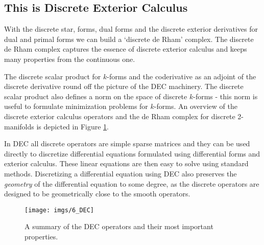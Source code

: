  
\subsection{This is Discrete Exterior Calculus}


With the discrete star, forms, dual forms and the discrete exterior derivatives for dual and primal forms we can build a `discrete de Rham' complex. The discrete de Rham complex captures the essence of discrete exterior calculus and keeps many properties from the continuous one. 

The discrete scalar product for $k$-forms and the coderivative as an adjoint of the discrete derivative round off the picture of the DEC machinery. The discrete scalar product also defines a norm on the space of discrete $k$-forms - this norm is useful to formulate minimization problems for $k$-forms.
An overview of the discrete exterior calculus operators and the de Rham complex for discrete 2-manifolds is depicted in Figure \ref{fig:DEC}. 

In DEC all discrete operators are simple sparse matrices and they can be used directly to discretize differential equations formulated using differential forms and exterior calculus. These linear equations are then easy to solve using standard methods. Discretizing a differential equation using DEC also preserves the \emph{geometry} of the differential equation to some degree, as the discrete operators are designed to be geometrically close to the smooth operators.


\begin{figure}%
\begin{center}
\texttt{[image: imgs/6\_DEC]}%
\end{center}
\caption{A summary of the DEC operators and their most important properties.}%
\label{fig:DEC}%
\end{figure}
